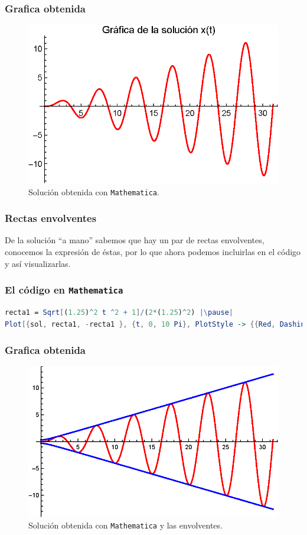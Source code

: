 \begin{frame}
\frametitle{Grafica obtenida}
\begin{figure}[H]
    \centering
    \includegraphics[scale=1]{Imagenes/Ejemplo_Resonancia_01_01.eps}
    \caption{Solución obtenida con \texttt{Mathematica}.}
\end{figure}
\end{frame}
\begin{frame}
\frametitle{Rectas envolventes}
De la solución \enquote{a mano} sabemos que hay un par de rectas envolventes, conocemos la expresión de éstas, por lo que ahora podemos incluirlas en el código y así visualizarlas.
\end{frame}
\begin{frame}[fragile]
\frametitle{El código en \texttt{Mathematica}}
\begin{lstlisting}[language=Mathematica]
recta1 = Sqrt[(1.25)^2 t ^2 + 1]/(2*(1.25)^2) |\pause|
Plot[{sol, recta1, -recta1 }, {t, 0, 10 Pi}, PlotStyle -> {{Red, Dashing[None]}, {Blue, Dashing[None]}, {Blue, Dashing[None]}}]
\end{lstlisting}
\end{frame}
\begin{frame}
\frametitle{Grafica obtenida}
\begin{figure}[H]
    \centering
    \includegraphics[scale=1]{Imagenes/Ejemplo_Resonancia_01_02.eps}
    \caption{Solución obtenida con \texttt{Mathematica} y las envolventes.}
\end{figure}
\end{frame}
